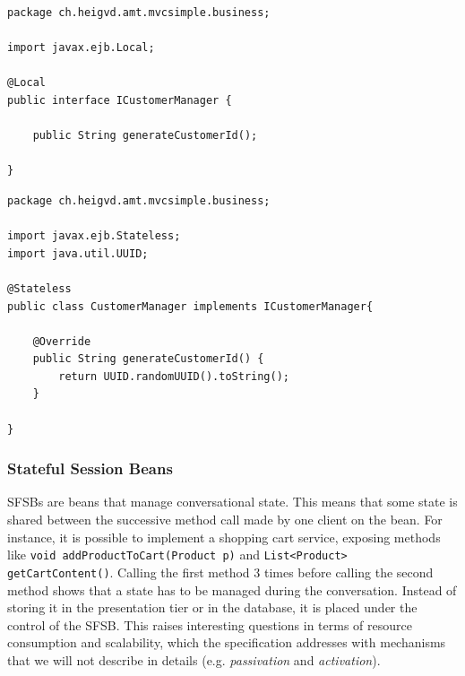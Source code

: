 
\vspace{10pt}
\begin{minipage}{\linewidth}
\begin{lstlisting}[frame=single]
package ch.heigvd.amt.mvcsimple.business;

import javax.ejb.Local;

@Local
public interface ICustomerManager {

    public String generateCustomerId();

}
\end{lstlisting}
\end{minipage}

\vspace{10pt}
\begin{minipage}{\linewidth}
\begin{lstlisting}[frame=single]
package ch.heigvd.amt.mvcsimple.business;

import javax.ejb.Stateless;
import java.util.UUID;

@Stateless
public class CustomerManager implements ICustomerManager{

    @Override
    public String generateCustomerId() {
        return UUID.randomUUID().toString();
    }

}
\end{lstlisting}
\end{minipage}


\subsubsection{Stateful Session Beans}


\ac{SFSB}s are beans that manage conversational state. This means that some state is shared between the successive method call made by one client on the bean. For instance, it is possible to implement a shopping cart service, exposing methods like \texttt{void addProductToCart(Product p)} and \texttt{List<Product> getCartContent()}. Calling the first method 3 times before calling the second method shows that a state has to be managed during the conversation. Instead of storing it in the presentation tier or in the database, it is placed under the control of the \ac{SFSB}. This raises interesting questions in terms of resource consumption and scalability, which the specification addresses with mechanisms that we will not describe in details (e.g. \emph{passivation} and \emph{activation}).

